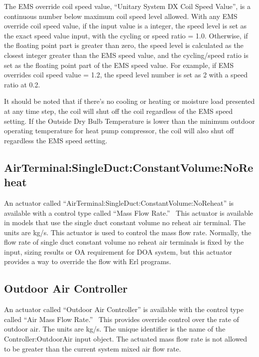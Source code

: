 The EMS override coil speed value, “Unitary System DX Coil Speed Value”, is a continuous number below maximum coil speed level allowed. With any EMS override coil speed value, if the input value is a integer, the speed level is set as the exact speed value input, with the cycling or speed ratio = 1.0. Otherwise, if the floating point part is greater than zero, the speed level is calculated as the closest integer greater than the EMS speed value, and the cycling/speed ratio is set as the floating point part of the EMS speed value. For example, if EMS overrides coil speed value = 1.2, the speed level number is set as 2 with a speed ratio at 0.2.

It should be noted that if there's no cooling or heating or moisture load presented at any time step, the coil will shut off the coil regardless of the EMS speed setting. If the Outside Dry Bulb Temperature is lower than the minimum outdoor operating temperature for heat pump compressor, the coil will also shut off regardless the EMS speed setting.

\subsection{AirTerminal:SingleDuct:ConstantVolume:NoReheat}\label{airTerminalsingleductconstantvolumenoreheat}

An actuator called ``AirTerminal:SingleDuct:ConstantVolume:NoReheat'' is available with a control type called ``Mass Flow Rate.''~ This actuator is available in models that use the single duct constant volume no reheat air terminal. The units are kg/s. This actuator is used to control the mass flow rate. Normally, the flow rate of single duct constant volume no reheat air terminals is fixed by the input, sizing results or OA requirement for DOA system, but this actuator provides a way to override the flow with Erl programs.

\subsection{Outdoor Air Controller}\label{outdoor-air-controller}

An actuator called ``Outdoor Air Controller'' is available with the control type called ``Air Mass Flow Rate.'' ~This provides override control over the rate of outdoor air. The units are kg/s. The unique identifier is the name of the Controller:OutdoorAir input object. The actuated mass flow rate is not allowed to be greater than the current system mixed air flow rate.

